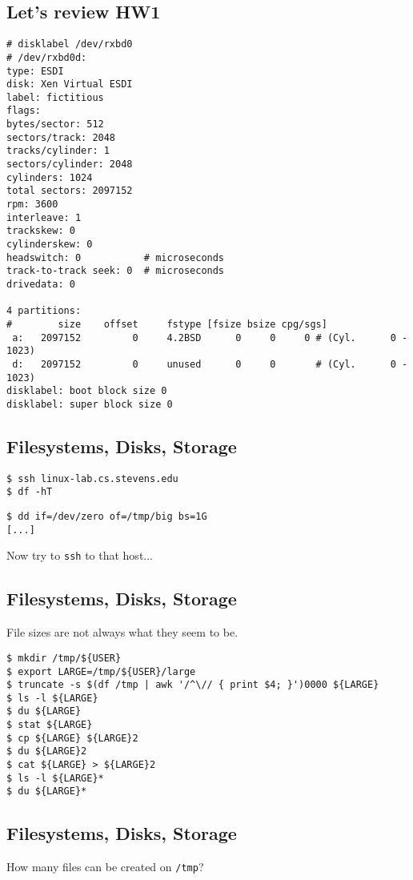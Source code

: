 \documentclass[xga]{xdvislides}
\begin{document}
\subsection{Let's review HW1}
\small
\begin{verbatim}
# disklabel /dev/rxbd0
# /dev/rxbd0d:
type: ESDI
disk: Xen Virtual ESDI
label: fictitious
flags:
bytes/sector: 512
sectors/track: 2048
tracks/cylinder: 1
sectors/cylinder: 2048
cylinders: 1024
total sectors: 2097152
rpm: 3600
interleave: 1
trackskew: 0
cylinderskew: 0
headswitch: 0           # microseconds
track-to-track seek: 0  # microseconds
drivedata: 0 

4 partitions:
#        size    offset     fstype [fsize bsize cpg/sgs]
 a:   2097152         0     4.2BSD      0     0     0 # (Cyl.      0 -   1023)
 d:   2097152         0     unused      0     0       # (Cyl.      0 -   1023)
disklabel: boot block size 0
disklabel: super block size 0
\end{verbatim}
\Normalsize

\subsection{Filesystems, Disks, Storage}
\begin{verbatim}
$ ssh linux-lab.cs.stevens.edu
$ df -hT
\end{verbatim}

\begin{verbatim}
$ dd if=/dev/zero of=/tmp/big bs=1G
[...]
\end{verbatim}

Now try to {\tt ssh} to that host...

\subsection{Filesystems, Disks, Storage}

File sizes are not always what they seem to be.

\begin{verbatim}
$ mkdir /tmp/${USER}
$ export LARGE=/tmp/${USER}/large
$ truncate -s $(df /tmp | awk '/^\// { print $4; }')0000 ${LARGE}
$ ls -l ${LARGE}
$ du ${LARGE}
$ stat ${LARGE}
$ cp ${LARGE} ${LARGE}2
$ du ${LARGE}2
$ cat ${LARGE} > ${LARGE}2
$ ls -l ${LARGE}*
$ du ${LARGE}*
\end{verbatim}

\subsection{Filesystems, Disks, Storage}
How many files can be created on {\tt /tmp}?
\end{document}
